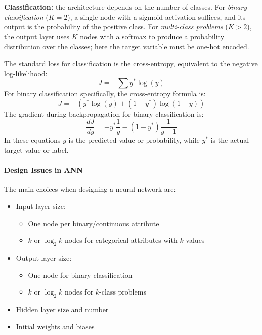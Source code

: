 \textbf{Classification:} the architecture depends on the number of classes. For \textit{binary classification} ($K=2$), a single node with a sigmoid activation suffices, and its output is the probability of the positive class. For \textit{multi-class problems} ($K>2$), the output layer uses $K$ nodes with a softmax to produce a probability distribution over the classes; here the target variable must be one-hot encoded.

The standard loss for classification is the cross-entropy, equivalent to the negative log-likelihood:
\begin{equation}
J = -\sum y^* \log(y)
\end{equation}
For binary classification specifically, the cross-entropy formula is:
\begin{equation}
J = -\left(y^* \log(y) + (1 - y^*)\log(1 - y)\right)    
\end{equation}
The gradient during backpropagation for binary classification is:
\begin{equation}
\frac{dJ}{dy} = -y^* \frac{1}{y} - (1 - y^*)\frac{1}{y - 1}
\end{equation}
In these equations $y$ is the predicted value or probability, while $y^*$ is the actual target value or label.
\paragraph{Design Issues in ANN}
The main choices when designing a neural network are:

\begin{itemize}
\item Input layer size:
  \begin{itemize}
  \item One node per binary/continuous attribute
  \item $k$ or $\log_2 k$ nodes for categorical attributes with $k$ values
  \end{itemize}
  
\item Output layer size:
  \begin{itemize}
  \item One node for binary classification
  \item $k$ or $\log_2 k$ nodes for $k$-class problems
  \end{itemize}
  
\item Hidden layer size and number
\item Initial weights and biases
\end{itemize}

